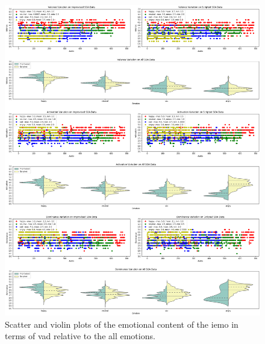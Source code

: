 \begin{figure}[H]
	\centering
	\includegraphics[width=\linewidth]{figs/appendix/IEMOCAP_data_study/allScatterViolins.png}
	\caption{Scatter and violin plots of the emotional content of the \ac{iemo} in terms of \ac{vad} relative to the all emotions.}
\end{figure}


